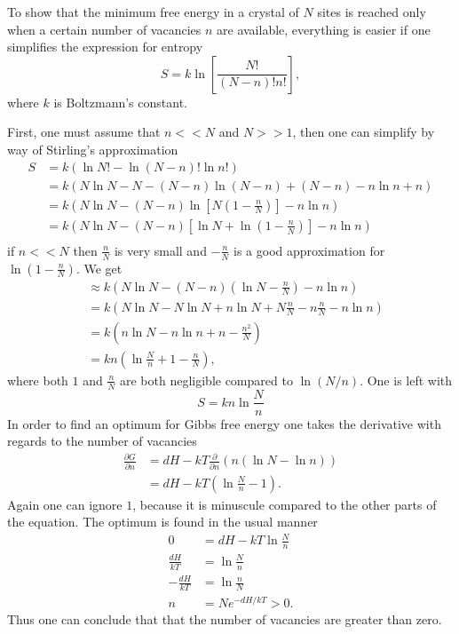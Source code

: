 \documentclass[10pt, a4paper]{amsart}
\begin{document}
To show that the minimum free energy in a crystal of $N$ sites is reached only when a certain number of vacancies $n$ are available, everything is easier if one  simplifies the expression for entropy
\begin{equation}
S = k \ln \left[ \frac{N!}{(N-n)!n!} \right],
\end{equation}
where $k$ is Boltzmann's constant.

First, one must assume that $n<<N$ and $N>>1$, then one can simplify by way of Stirling's approximation
\begin{align*}
S 	&= k(\ln N!-\ln(N-n)! \ln n!) \\
	&= k(N \ln N - N - (N - n) \ln (N - n) + (N - n) - n \ln n + n) \\
	&= k(N \ln N - (N - n) \ln \left[N\left(1 - \frac{n}{N} \right)\right] - n \ln n) \\
	&= k(N \ln N - (N - n) \left[\ln N + \ln \left(1 - \frac{n}{N} \right)\right] - n \ln n) \\
\end{align*}
if $n<< N$ then $\frac{n}{N}$ is very small and $-\frac{n}{N}$ is a good approximation for $\ln\left(1-\frac{n}{N}\right)$. We get
\begin{align*}
 &\approx k(N \ln N - (N - n) \left(\ln N -\frac{n}{N}\right) - n \ln n) \\
 &= k(N \ln N - N\ln N +n \ln N + N\frac{n}{N} - n\frac{n}{N}- n \ln n) \\
 &= k(n\ln N - n\ln n + n - \frac{n^2}{N}) \\
 &= kn\left(\ln \frac{N}{n} + 1 - \frac{n}{N} \right),
\end{align*}
where both $1$ and $\frac{n}{N}$ are both negligible compared to $\ln(N/n)$. One is left with
\begin{equation}
S = kn \ln \frac{N}{n}
\end{equation}
In order to find an optimum for Gibbs free energy one takes the derivative with regards to the number of vacancies
\begin{align*}
\frac{\partial G}{\partial n} 	&= dH - kT \frac{\partial}{\partial n}\left(n(\ln N - \ln n) \right) \\
								&= dH - kT \left(\ln \frac{N}{n} -1 \right).
\end{align*}
Again one can ignore $1$, because it is minuscule compared to the other parts of the equation. The optimum is found in the usual manner
\begin{align*}
0 &= dH - kT \ln\frac{N}{n} \\
\frac{dH}{kT}  &= \ln\frac{N}{n} \\
-\frac{dH}{kT} &= \ln\frac{n}{N} \\
n & = Ne^{-dH/kT}>0.
\end{align*} 
Thus one can conclude that that the number of vacancies are greater than zero.
\end{document}
